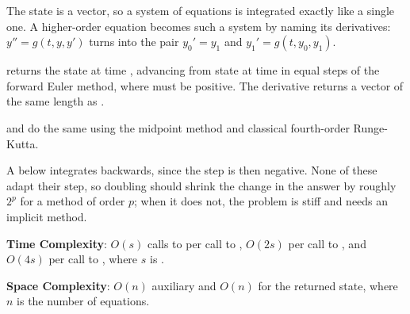 The state is a vector, so a system of equations is integrated exactly like a single one. A higher-order equation becomes such a system by naming its derivatives: $y'' = g(t, y, y')$ turns into the pair $y_0' = y_1$ and $y_1' = g(t, y_0, y_1)$.

\begin{compactitem}
  \item {} returns the state at time , advancing from state  at time  in  equal steps of the forward Euler method, where  must be positive. The derivative  returns a vector of the same length as .
  \item {} and  do the same using the midpoint method and classical fourth-order Runge-Kutta.
\end{compactitem}

A  below  integrates backwards, since the step is then negative. None of these adapt their step, so doubling  should shrink the change in the answer by roughly $2^p$ for a method of order $p$; when it does not, the problem is stiff and needs an implicit method.

\textbf{Time Complexity}: $O(s)$ calls to  per call to , $O(2s)$ per call to , and $O(4s)$ per call to , where $s$ is .

\textbf{Space Complexity}: $O(n)$ auxiliary and $O(n)$ for the returned state, where $n$ is the number of equations.

